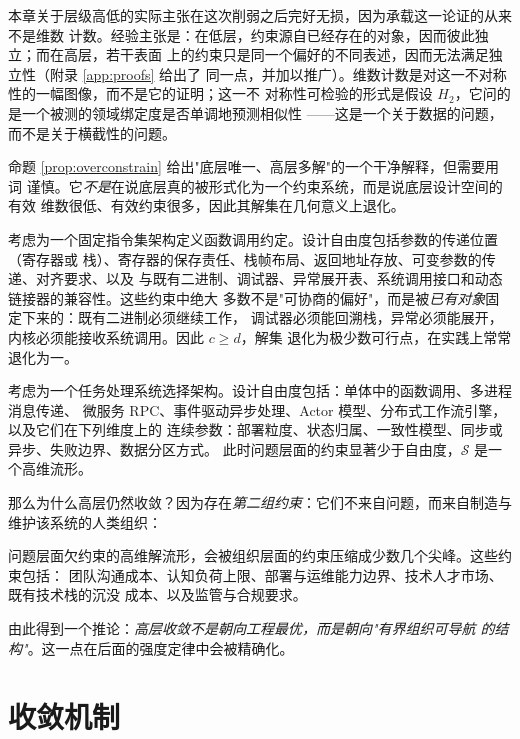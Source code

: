本章关于层级高低的实际主张在这次削弱之后完好无损，因为承载这一论证的从来不是维数
计数。经验主张是：在低层，约束源自已经存在的对象，因而彼此独立；而在高层，若干表面
上的约束只是同一个偏好的不同表述，因而无法满足独立性（附录 \ref{app:proofs} 给出了
同一点，并加以推广）。维数计数是对这一不对称性的一幅图像，而不是它的证明；这一不
对称性可检验的形式是假设 $H_2$，它问的是一个被测的领域绑定度是否单调地预测相似性
——这是一个关于数据的问题，而不是关于横截性的问题。

命题 \ref{prop:overconstrain} 给出"底层唯一、高层多解"的一个干净解释，但需要用词
谨慎。它\emph{不是}在说底层真的被形式化为一个约束系统，而是说底层设计空间的有效
维数很低、有效约束很多，因此其解集在几何意义上退化。

\begin{example}[底层]\label{ex:abi}
考虑为一个固定指令集架构定义函数调用约定。设计自由度包括参数的传递位置（寄存器或
栈）、寄存器的保存责任、栈帧布局、返回地址存放、可变参数的传递、对齐要求、以及
与既有二进制、调试器、异常展开表、系统调用接口和动态链接器的兼容性。这些约束中绝大
多数不是"可协商的偏好"，而是被\emph{已有对象}固定下来的：既有二进制必须继续工作，
调试器必须能回溯栈，异常必须能展开，内核必须能接收系统调用。因此 $c \ge d$，解集
退化为极少数可行点，在实践上常常退化为一。
\end{example}

\begin{example}[高层]\label{ex:arch}
考虑为一个任务处理系统选择架构。设计自由度包括：单体中的函数调用、多进程消息传递、
微服务 RPC、事件驱动异步处理、Actor 模型、分布式工作流引擎，以及它们在下列维度上的
连续参数：部署粒度、状态归属、一致性模型、同步或异步、失败边界、数据分区方式。
此时问题层面的约束显著少于自由度，$\mathcal{S}$ 是一个高维流形。
\end{example}

那么为什么高层仍然收敛？因为存在\emph{第二组约束}：它们不来自问题，而来自制造与
维护该系统的人类组织：

\begin{principle}[组织约束对解集的压缩]\label{pr:org}
问题层面欠约束的高维解流形，会被组织层面的约束压缩成少数几个尖峰。这些约束包括：
团队沟通成本、认知负荷上限、部署与运维能力边界、技术人才市场、既有技术栈的沉没
成本、以及监管与合规要求。
\end{principle}

由此得到一个推论：\emph{高层收敛不是朝向工程最优，而是朝向"有界组织可导航
的结构"}。这一点在后面的强度定律中会被精确化。

\section{收敛机制}\label{sec:mechanisms}


